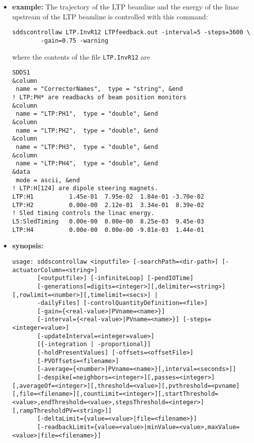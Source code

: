 \begin{itemize}
\item {\bf example:} 
%
% 
%
The trajectory of the LTP beamline and the energy of the linac upstream of the LTP
beamline is controlled with this command:
\begin{verbatim}
sddscontrollaw LTP.InvR12 LTPfeedback.out -interval=5 -steps=3600 \
        -gain=0.75 -warning
\end{verbatim}
where the contents of the file \verb+LTP.InvR12+ are
\begin{verbatim}
SDDS1
&column
 name = "CorrectorNames",  type = "string", &end
! LTP:PH* are readbacks of beam position monitors
&column
 name = "LTP:PH1",  type = "double", &end
&column             
 name = "LTP:PH2",  type = "double", &end
&column             
 name = "LTP:PH3",  type = "double", &end
&column             
 name = "LTP:PH4",  type = "double", &end
&data
 mode = ascii, &end
! LTP:H[124] are dipole steering magnets.
LTP:H1          1.45e-01  7.95e-02  1.84e-01 -3.70e-02 
LTP:H2          0.00e-00  2.12e-01  3.34e-01  8.39e-02 
! Sled timing controls the linac energy.
L5:SledTiming   0.00e-00  0.00e-00  8.25e-03  9.45e-03 
LTP:H4          0.00e-00  0.00e-00 -9.81e-03  1.44e-01 
\end{verbatim}
\item {\bf synopsis:} 
%
%
\begin{verbatim}
usage: sddscontrollaw <inputfile> [-searchPath=<dir-path>] [-actuatorColumn=<string>]
       [<outputfile>] [-infiniteLoop] [-pendIOTime] 
       [-generations[=digits=<integer>][,delimiter=<string>][,rowlimit=<number>][,timelimit=<secs>] | 
       -dailyFiles] [-controlQuantityDefinition=<file>]
       [-gain={<real-value>|PVname=<name>}]
       [-interval={<real-value>|PVname=<name>}] [-steps=<integer=value>]
       [-updateInterval=<integer=value>]
       [{-integration | -proportional}]
       [-holdPresentValues] [-offsets=<offsetFile>]
       [-PVOffsets=<filename>] 
       [-average={<number>|PVname=<name>}[,interval=<seconds>]] 
       [-despike[=neighbors=<integer>][,passes=<integer>][,averageOf=<integer>][,threshold=<value>][,pvthreshold=<pvname][,file=<filename>][,countLimit=<integer>][,startThreshold=<value>,endThreshold=<value>,stepsThreshold=<integer>][,rampThresholdPV=<string>]]
       [-deltaLimit={value=<value>|file=<filename>}]
       [-readbackLimit={value=<value>|minValue=<value>,maxValue=<value>|file=<filename>}]

\end{verbatim}
\end{itemize}
